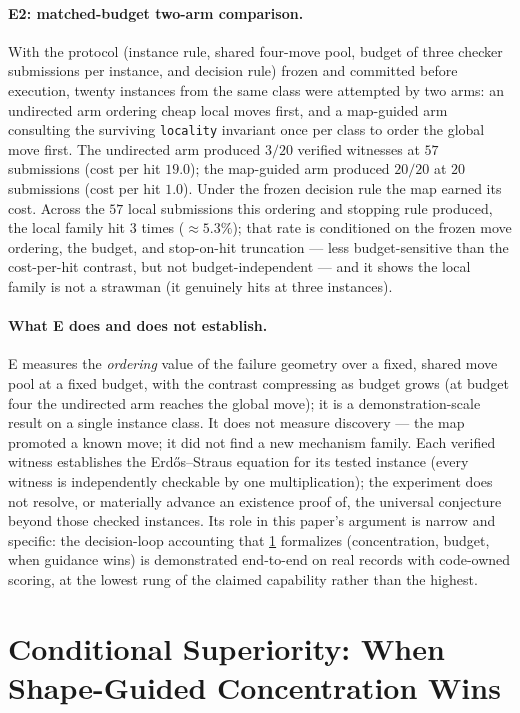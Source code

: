 \documentclass[11pt]{article}
\theoremstyle{gowthm}
\theoremstyle{gowplain}
\begin{document}
\paragraph{E2: matched-budget two-arm comparison.}
With the protocol (instance rule, shared four-move pool, budget of three
checker submissions per instance, and decision rule) frozen and committed
before execution, twenty instances from the same class were attempted by two
arms: an undirected arm ordering cheap local moves first, and a map-guided
arm consulting the surviving \texttt{locality} invariant once per class to
order the global move first. The undirected arm produced $3/20$ verified
witnesses at $57$ submissions (cost per hit $19.0$); the map-guided arm
produced $20/20$ at $20$ submissions (cost per hit $1.0$). Under the frozen
decision rule the map earned its cost. Across the $57$ local submissions
this ordering and stopping rule produced, the local family hit $3$ times
($\approx 5.3\%$); that rate is conditioned on the frozen move ordering,
the budget, and stop-on-hit truncation --- less budget-sensitive than the
cost-per-hit contrast, but not budget-independent --- and it shows the
local family is not a strawman (it genuinely hits at three instances).

\paragraph{What E does and does not establish.}
E measures the \emph{ordering} value of the failure geometry over a fixed,
shared move pool at a fixed budget, with the contrast compressing as budget
grows (at budget four the undirected arm reaches the global move); it is a
demonstration-scale result on a single instance class. It does not measure
discovery --- the map promoted a known move; it did not find a new mechanism
family. Each verified witness establishes the Erd\H{o}s--Straus equation for
its tested instance (every witness is independently checkable by one
multiplication); the experiment does not resolve, or materially advance an
existence proof of, the universal conjecture beyond those checked instances.
Its role in this paper's argument is narrow and specific:
the decision-loop accounting that \cref{sec:superiority} formalizes
(concentration, budget, when guidance wins) is demonstrated end-to-end on
real records with code-owned scoring, at the lowest rung of the claimed
capability rather than the highest.

\section{Conditional Superiority: When Shape-Guided Concentration Wins}
\label{sec:superiority}
\end{document}
